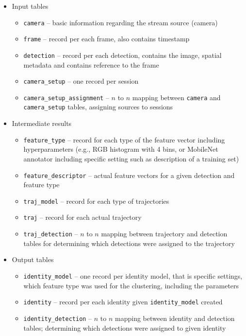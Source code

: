 \begin{itemize}
    \setlength\itemsep{1em}
    \item Input tables \begin{itemize}
        \item \verb+camera+ -- basic information regarding the stream source (camera)
        \item \verb+frame+ -- record per each frame, also contains timestamp
        \item \verb+detection+ -- record per each detection, contains the image, spatial metadata and contains reference to the frame
        \item \verb+camera_setup+ -- one record per session
        \item \verb+camera_setup_assignment+ -- $n$ to $n$ mapping between \verb+camera+ and \verb+camera_setup+ tables, assigning sources to sessions
    \end{itemize}
    
    \item Intermediate results \begin{itemize}
        \item \verb+feature_type+ -- record for each type of the feature vector including hyperparameters (e.g., RGB histogram with 4 bins, or MobileNet annotator including specific setting such as description of a training set)
        \item \verb+feature_descriptor+ -- actual feature vectors for a given detection and feature type
        \item \verb+traj_model+ -- record for each type of trajectories
        \item \verb+traj+ -- record for each actual trajectory
        \item \verb+traj_detection+ -- $n$ to $n$ mapping between trajectory and detection tables for determining which detections were assigned to the trajectory
    \end{itemize}
    
    \item Output tables \begin{itemize}
        \item \verb+identity_model+ -- one record per identity model, that is specific settings, which feature type was used for the clustering, including the parameters
        \item \verb+identity+ -- record per each identity given \verb+identity_model+ created
        \item \verb+identity_detection+ -- $n$ to $n$ mapping between identity and detection tables; determining which detections were assigned to given identity
    \end{itemize}
\end{itemize}




